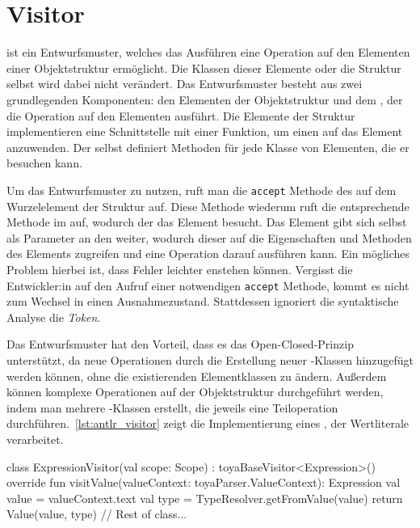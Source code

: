 \section{Visitor}

\visitor ist ein Entwurfsmuster, welches das Ausführen eine Operation auf den Elementen einer Objektstruktur ermöglicht. Die Klassen dieser Elemente oder die Struktur selbst wird dabei nicht verändert. Das Entwurfsmuster besteht aus zwei grundlegenden Komponenten: den Elementen der Objektstruktur und dem \visitor, der die Operation auf den Elementen ausführt. Die Elemente der Struktur implementieren eine Schnittstelle mit einer Funktion, um einen \visitor auf das Element anzuwenden. Der \visitor selbst definiert Methoden für jede Klasse von Elementen, die er besuchen kann.

Um das Entwurfsmuster zu nutzen, ruft man die \texttt{accept} Methode des \visitors auf dem Wurzelelement der Struktur auf. Diese Methode wiederum ruft die entsprechende Methode im \visitor auf, wodurch der \visitor das Element besucht. Das Element gibt sich selbst als Parameter an den \visitor weiter, wodurch dieser auf die Eigenschaften und Methoden des Elements zugreifen und eine Operation darauf ausführen kann. Ein mögliches Problem hierbei ist, dass Fehler leichter enstehen können. Vergisst die Entwickler:in auf den Aufruf einer notwendigen \texttt{accept} Methode, kommt es nicht zum Wechsel in einen Ausnahmezustand. Stattdessen ignoriert die syntaktische Analyse die \textit{Token}.

Das \visitor Entwurfsmuster hat den Vorteil, dass es das Open-Closed-Prinzip unterstützt, da neue Operationen durch die Erstellung neuer \visitor-Klassen hinzugefügt werden können, ohne die existierenden Elementklassen zu ändern. Außerdem können komplexe Operationen auf der Objektstruktur durchgeführt werden, indem man mehrere \visitor-Klassen erstellt, die jeweils eine Teiloperation durchführen.~\autoref{lst:antlr_visitor} zeigt die Implementierung eines \visitors, der Wertliterale verarbeitet.

\begin{KotlinCode}[numbers=none, caption={Implementierung eines \visitors für Wertliterale.}, label=lst:antlr_visitor]
class ExpressionVisitor(val scope: Scope) : toyaBaseVisitor<Expression>() {
    override fun visitValue(valueContext: toyaParser.ValueContext): Expression {
        val value = valueContext.text
        val type = TypeResolver.getFromValue(value)
        return Value(value, type)
    }
    // Rest of class...
}
\end{KotlinCode}
